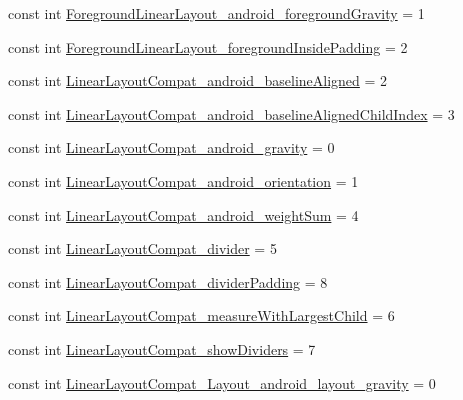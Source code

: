 \begin{DoxyCompactItemize}
\item 
const int \mbox{\hyperlink{class_f_w_p_s___app_1_1_droid_1_1_resource_1_1_styleable_a7f83b7136da479a0ed2bc8120751258d}{Foreground\+Linear\+Layout\+\_\+android\+\_\+foreground\+Gravity}} = 1
\item 
const int \mbox{\hyperlink{class_f_w_p_s___app_1_1_droid_1_1_resource_1_1_styleable_a5da5e81e79c1d275ccdbfa340bad3b22}{Foreground\+Linear\+Layout\+\_\+foreground\+Inside\+Padding}} = 2
\item 
const int \mbox{\hyperlink{class_f_w_p_s___app_1_1_droid_1_1_resource_1_1_styleable_a16fde99f7f78826cd62567f0cbc26a23}{Linear\+Layout\+Compat\+\_\+android\+\_\+baseline\+Aligned}} = 2
\item 
const int \mbox{\hyperlink{class_f_w_p_s___app_1_1_droid_1_1_resource_1_1_styleable_a6431e6d120dfbf5b6fff724d94512f35}{Linear\+Layout\+Compat\+\_\+android\+\_\+baseline\+Aligned\+Child\+Index}} = 3
\item 
const int \mbox{\hyperlink{class_f_w_p_s___app_1_1_droid_1_1_resource_1_1_styleable_a4796ffd81c0fdb4b5737f4e9c928f56d}{Linear\+Layout\+Compat\+\_\+android\+\_\+gravity}} = 0
\item 
const int \mbox{\hyperlink{class_f_w_p_s___app_1_1_droid_1_1_resource_1_1_styleable_aa59cd03449093d5aa70559a16b71ecef}{Linear\+Layout\+Compat\+\_\+android\+\_\+orientation}} = 1
\item 
const int \mbox{\hyperlink{class_f_w_p_s___app_1_1_droid_1_1_resource_1_1_styleable_aba07483ae6f5f3828901215a0073be50}{Linear\+Layout\+Compat\+\_\+android\+\_\+weight\+Sum}} = 4
\item 
const int \mbox{\hyperlink{class_f_w_p_s___app_1_1_droid_1_1_resource_1_1_styleable_abfa9552dce0338537f71eb3da7f6e2b8}{Linear\+Layout\+Compat\+\_\+divider}} = 5
\item 
const int \mbox{\hyperlink{class_f_w_p_s___app_1_1_droid_1_1_resource_1_1_styleable_aef8d73fe4696c3574939333f202219ca}{Linear\+Layout\+Compat\+\_\+divider\+Padding}} = 8
\item 
const int \mbox{\hyperlink{class_f_w_p_s___app_1_1_droid_1_1_resource_1_1_styleable_a7e68edd668d3a61a2916d191bb026498}{Linear\+Layout\+Compat\+\_\+measure\+With\+Largest\+Child}} = 6
\item 
const int \mbox{\hyperlink{class_f_w_p_s___app_1_1_droid_1_1_resource_1_1_styleable_a39787cb156627cfe66b74cb18e2eae42}{Linear\+Layout\+Compat\+\_\+show\+Dividers}} = 7
\item 
const int \mbox{\hyperlink{class_f_w_p_s___app_1_1_droid_1_1_resource_1_1_styleable_ae319694d4db4b8736b3119b1069bb07d}{Linear\+Layout\+Compat\+\_\+\+Layout\+\_\+android\+\_\+layout\+\_\+gravity}} = 0

\end{DoxyCompactItemize}
